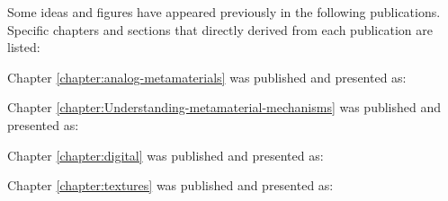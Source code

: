 
\noindent 
Some ideas and figures have appeared previously in the following publications. Specific chapters and sections that directly derived from each publication are listed:

Chapter \ref{chapter:analog-metamaterials} was published and presented as: 

Chapter \ref{chapter:Understanding-metamaterial-mechanisms} was published and presented as: 

Chapter \ref{chapter:digital} was published and presented as: 

Chapter \ref{chapter:textures} was published and presented as: 




